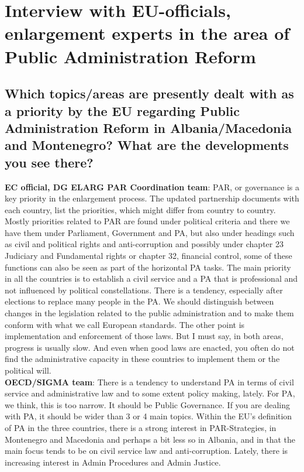 
\chapter{Interview with EU-officials, enlargement experts in the area of Public Administration Reform}
\section{Which topics/areas are presently dealt with as a priority by the EU regarding Public Administration Reform in Albania/Macedonia and Montenegro? What are the developments you see there? }
\textbf{EC official, DG ELARG PAR Coordination team}: PAR, or governance is a key priority in the enlargement process. The updated partnership documents with each country, list the priorities, which might differ from country to country. Mostly priorities related to PAR are found under political criteria and there we have them under Parliament, Government and PA, but also under headings such as civil and political rights and anti-corruption and possibly under chapter 23 Judiciary and Fundamental rights or chapter 32, financial control, some of these functions can also be seen as part of the horizontal PA tasks. The main priority in all the countries is to establish a civil service and a PA that is professional and not influenced by political constellations. There is a tendency, especially after elections to replace many people in the PA. We should distinguish between changes in the legislation related to the public administration and to make them conform with what we call European standards. The other point is implementation and enforcement of those laws. But I must say, in both areas, progress is usually slow. And even when good laws are enacted, you often do not find the administrative capacity in these countries to implement them or the political will. \\
\textbf{OECD/SIGMA team}: There is a tendency to understand PA in terms of civil service and administrative law and to some extent policy making, lately. For PA, we think, this is too narrow. It should be Public Governance. If you are dealing with PA, it should be wider than 3 or 4 main topics. Within the EU's definition of PA in the three countries, there is a strong interest in PAR-Strategies, in Montenegro and Macedonia and perhaps a bit less so in Albania, and in that the main focus tends to be on civil service law and anti-corruption. Lately, there is increasing interest in Admin Procedures and Admin Justice.\\
